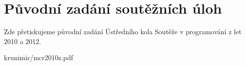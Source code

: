 \appendix

\chapter{Původní zadání soutěžních úloh}

Zde přetiskujeme původní zadání Ústředního kola Soutěže v programování z let
2010 a 2012.


\newpage 

\label{pdf:krunimir}
 {krunimir/mcr2010z.pdf}

\label{pdf:banshee}

